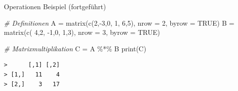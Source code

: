 \documentclass[
  8pt,
  ignorenonframetext,
]{beamer}
\newenvironment{Shaded}{\begin{snugshade}}{\end{snugshade}}
\newcommand{\AttributeTok}[1]{\textcolor[rgb]{0.77,0.63,0.00}{#1}}
\newcommand{\CommentTok}[1]{\textcolor[rgb]{0.56,0.35,0.01}{\textit{#1}}}
\newcommand{\ConstantTok}[1]{\textcolor[rgb]{0.00,0.00,0.00}{#1}}
\newcommand{\DecValTok}[1]{\textcolor[rgb]{0.00,0.00,0.81}{#1}}
\newcommand{\FunctionTok}[1]{\textcolor[rgb]{0.00,0.00,0.00}{#1}}
\newcommand{\NormalTok}[1]{#1}
\newcommand{\OtherTok}[1]{\textcolor[rgb]{0.56,0.35,0.01}{#1}}
\newcommand{\SpecialCharTok}[1]{\textcolor[rgb]{0.00,0.00,0.00}{#1}}
\begin{document}
\begin{frame}[fragile]{Operationen}
\protect\hypertarget{operationen-17}{}
Beispiel (fortgeführt) \vspace{2mm}

\footnotesize

\begin{Shaded}
\begin{Highlighting}[]
\CommentTok{\# Definitionen}
\NormalTok{A }\OtherTok{=} \FunctionTok{matrix}\NormalTok{(}\FunctionTok{c}\NormalTok{(}\DecValTok{2}\NormalTok{,}\SpecialCharTok{{-}}\DecValTok{3}\NormalTok{,}\DecValTok{0}\NormalTok{,}
             \DecValTok{1}\NormalTok{, }\DecValTok{6}\NormalTok{,}\DecValTok{5}\NormalTok{),}
           \AttributeTok{nrow  =} \DecValTok{2}\NormalTok{,}
           \AttributeTok{byrow =} \ConstantTok{TRUE}\NormalTok{)}
\NormalTok{B }\OtherTok{=} \FunctionTok{matrix}\NormalTok{(}\FunctionTok{c}\NormalTok{( }\DecValTok{4}\NormalTok{,}\DecValTok{2}\NormalTok{,}
             \SpecialCharTok{{-}}\DecValTok{1}\NormalTok{,}\DecValTok{0}\NormalTok{,}
              \DecValTok{1}\NormalTok{,}\DecValTok{3}\NormalTok{),}
           \AttributeTok{nrow  =} \DecValTok{3}\NormalTok{,}
           \AttributeTok{byrow =} \ConstantTok{TRUE}\NormalTok{)}

\CommentTok{\# Matrixmultiplikation}
\NormalTok{C }\OtherTok{=}\NormalTok{ A }\SpecialCharTok{\%*\%}\NormalTok{ B}
\FunctionTok{print}\NormalTok{(C)}
\end{Highlighting}
\end{Shaded}

\begin{verbatim}
>      [,1] [,2]
> [1,]   11    4
> [2,]    3   17
\end{verbatim}
\end{frame}
\end{document}
